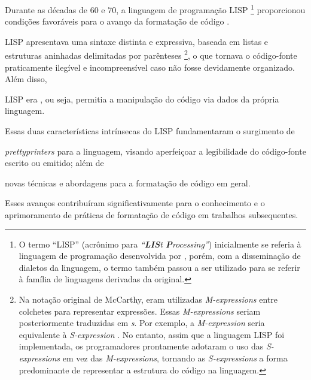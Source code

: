 \documentclass
  [11pt,a4paper,english,brazil,openright,sumario=tradicional,twoside]
  {abntex2}
\begin{document}
  Durante as décadas de 60 e 70, a linguagem de programação LISP%
  \footnote
    {O termo ``LISP'' (acrônimo para
     \textit{``\textbf{LIS}t \textbf{P}rocessing''})
     inicialmente se referia à linguagem de programação desenvolvida por
     \textcite{mccarthy-1960-recursive}, porém, com a disseminação de dialetos
     da linguagem, o termo também passou a ser utilizado para se referir à
     família de linguagens derivadas da original.}
  proporcionou condições favoráveis para o avanço da formatação de código
  \cite[2]{yelland-2015-new}.
  \begin{inparaenum}
    \item LISP apresentava uma sintaxe distinta e expressiva, baseada em listas
          e estruturas aninhadas delimitadas por parênteses%
          \footnote
            {Na notação original de McCarthy, eram utilizadas
             \textit{M-expressions} entre colchetes para representar
             expressões. Essas \textit{M-expressions} seriam posteriormente
             traduzidas em \textit{s}. Por exemplo, a
             \textit{M-expression}  seria
             equivalente à \textit{S-expression}
             .
             No entanto, assim que a linguagem LISP foi implementada, os
             programadores prontamente adotaram o uso das
             \textit{S-expressions} em vez das \textit{M-expressions}, tornando
             as \textit{S-expressions} a forma predominante de representar a
             estrutura do código na linguagem.},
          o que tornava o código-fonte praticamente ilegível e incompreensível
          caso não fosse devidamente organizado. Além disso,
    \item LISP era , ou seja, permitia a manipulação do
          código via dados da própria linguagem.
  \end{inparaenum}
  Essas duas características intrínsecas do LISP fundamentaram o surgimento de
  \begin{inparaenum}
    \item \textit{prettyprinters} para a linguagem, visando aperfeiçoar a
          legibilidade do código-fonte escrito ou emitido; além de
    \item novas técnicas e abordagens para a formatação de código em geral.
  \end{inparaenum}
  Esses avanços contribuíram significativamente para o conhecimento e o
  aprimoramento de práticas de formatação de código em trabalhos subsequentes.
\end{document}
